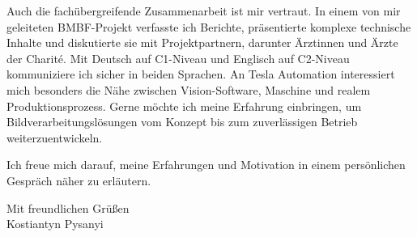 \documentclass[11pt,a4paper]{article}
\begin{document}
Auch die fachübergreifende Zusammenarbeit ist mir vertraut. In einem von mir geleiteten BMBF-Projekt verfasste ich Berichte, präsentierte komplexe technische Inhalte und diskutierte sie mit Projektpartnern, darunter Ärztinnen und Ärzte der Charité. Mit Deutsch auf C1-Niveau und Englisch auf C2-Niveau kommuniziere ich sicher in beiden Sprachen.
An Tesla Automation interessiert mich besonders die Nähe zwischen Vision-Software, Maschine und realem Produktionsprozess. Gerne möchte ich meine Erfahrung einbringen, um Bildverarbeitungslösungen vom Konzept bis zum zuverlässigen Betrieb weiterzuentwickeln.

Ich freue mich darauf, meine Erfahrungen und Motivation in einem persönlichen Gespräch näher zu erläutern.

Mit freundlichen Grüßen\\[0.8em]
Kostiantyn Pysanyi
\end{document}
